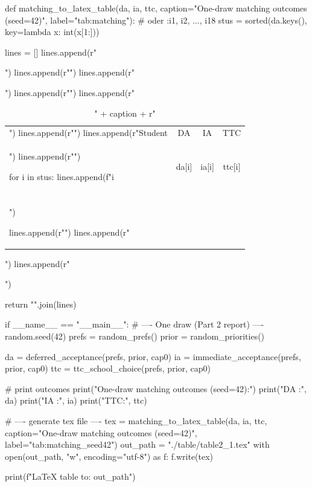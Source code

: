
def matching_to_latex_table(da, ia, ttc,
                            caption="One-draw matching outcomes (seed=42)",
                            label="tab:matching"):
    # oder :i1, i2, ..., i18 
    stus = sorted(da.keys(), key=lambda x: int(x[1:]))

    lines = []
    lines.append(r"\begin{table}[!htbp]")
    lines.append(r"\centering")
    lines.append(r"\caption{" + caption + r"}")
    lines.append(r"\label{" + label + r"}")
    lines.append(r"\begin{tabular}{lccc}")
    lines.append(r"\hline")
    lines.append(r"Student & DA & IA & TTC \\")
    lines.append(r"\hline")

    for i in stus:
        lines.append(f"{i} & {da[i]} & {ia[i]} & {ttc[i]} \\\\")

    lines.append(r"\hline")
    lines.append(r"\end{tabular}")
    lines.append(r"\end{table}")

    return "\n".join(lines)

if __name__ == "__main__":
    # ---- One draw (Part 2 report) ----
    random.seed(42)
    prefs = random_prefs()
    prior = random_priorities()

    da  = deferred_acceptance(prefs, prior, cap0)
    ia  = immediate_acceptance(prefs, prior, cap0)
    ttc = ttc_school_choice(prefs, prior, cap0)

    # print outcomes
    print("One-draw matching outcomes (seed=42):")
    print("DA :", da)
    print("IA :", ia)
    print("TTC:", ttc)

    # ---- generate tex file ----
    tex = matching_to_latex_table(da, ia, ttc,
                                  caption="One-draw matching outcomes (seed=42)",
                                  label="tab:matching_seed42")
    out_path = "./table/table2_1.tex"
    with open(out_path, "w", encoding="utf-8") as f:
        f.write(tex)

    print(f"\nSaved LaTeX table to: {out_path}")